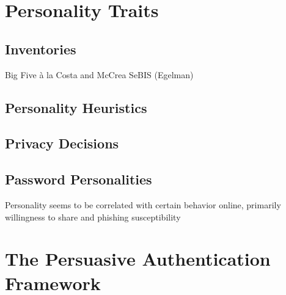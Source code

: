 \section{Personality Traits}
	\subsection{Inventories}
	Big Five à la Costa and McCrea \cite{Costa1992NEO}
	SeBIS (Egelman)
	\subsection{Personality Heuristics}	
	\subsection{Privacy Decisions}
	\subsection{Password Personalities}
	
	
	Personality seems to be correlated with certain behavior online, primarily willingness to share and phishing susceptibility \cite{Halevi2013PilotStudyPersonality}

\section{The Persuasive Authentication Framework}


